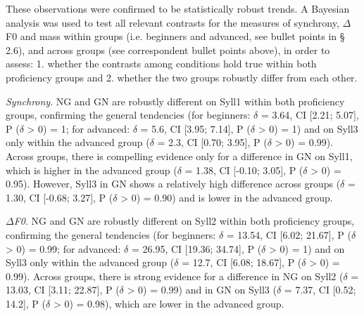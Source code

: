 \begin{styleStandard}
These observations were confirmed to be statistically robust trends. A Bayesian analysis was used to test all relevant contrasts for the measures of synchrony, ${\Delta}$F0 and mass within groups (i.e. beginners and advanced, see bullet points in § 2.6), and across groups (see correspondent bullet points above), in order to assess: 1. whether the contrasts among conditions hold true within both proficiency groups and 2. whether the two groups robustly differ from each other.
\end{styleStandard}

\begin{listWWNumiiileveli}
\item 
\begin{stylelsBulletList}
\textit{Synchrony}. NG and GN are robustly different on Syll1 within both proficiency groups, confirming the general tendencies (for beginners: $\delta $ = 3.64, CI [2.21; 5.07], P ($\delta $ {\textgreater} 0) = 1; for advanced: $\delta $ = 5.6, CI [3.95; 7.14], P ($\delta $ {\textgreater} 0) = 1) and on Syll3 only within the advanced group ($\delta $ = 2.3, CI [0.70; 3.95], P ($\delta $ {\textgreater} 0) = 0.99). Across groups, there is compelling evidence only for a difference in GN on Syll1, which is higher in the advanced group ($\delta $ = 1.38, CI [-0.10; 3.05], P ($\delta $ {\textgreater} 0) = 0.95). However, Syll3 in GN shows a relatively high difference across groups ($\delta $ = 1.30, CI [-0.68; 3.27], P ($\delta $ {\textgreater} 0) = 0.90) and is lower in the advanced group.
\end{stylelsBulletList}
\item 
\begin{stylelsBulletList}
\textit{${\Delta}$F0}. NG and GN are robustly different on Syll2 within both proficiency groups, confirming the general tendencies (for beginners: $\delta $ = 13.54, CI [6.02; 21.67], P ($\delta $ {\textgreater} 0) = 0.99; for advanced: $\delta $ = 26.95, CI [19.36; 34.74], P ($\delta $ {\textgreater} 0) = 1) and on Syll3 only within the advanced group ($\delta $ = 12.7, CI [6.08; 18.67], P ($\delta $ {\textgreater} 0) = 0.99). Across groups, there is strong evidence for a difference in NG on Syll2 ($\delta $ = 13.03, CI [3.11; 22.87], P ($\delta $ {\textgreater} 0) = 0.99) and in GN on Syll3 ($\delta $ = 7.37, CI [0.52; 14.2], P ($\delta $ {\textgreater} 0) = 0.98), which are lower in the advanced group.
\end{stylelsBulletList}
\item 

\end{listWWNumiiileveli}
